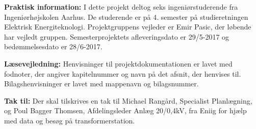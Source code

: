 


\textbf{Praktisk information:} I dette projekt deltog seks ingeniørstuderende fra Ingeniørhøjskolen Aarhus. De studerende er på 4. semester på studieretningen Elektrisk Energiteknologi. Projektgruppens vejleder er Emir Pasic, der løbende har vejledt gruppen. Semesterprojektets afleveringsdato er 29/5-2017 og bedømmelsesdato er 28/6-2017. 

\textbf{Læsevejledning:} Henvisninger til projektdokumentationen er lavet med fodnoter, der angiver kapitelnummer og navn på det afsnit, der henvises til. Bilagshenvisninger er lavet med mappenavn og bilagsnummer. 

\textbf{Tak til:} Der skal tilskrives en tak til Michael Rangård, Specialist Planlægning, og Poul Bagger Thomsen, Afdelingsleder Anlæg 20/0,4kV, fra Eniig for hjælp med data og besøg på transformerstation.
